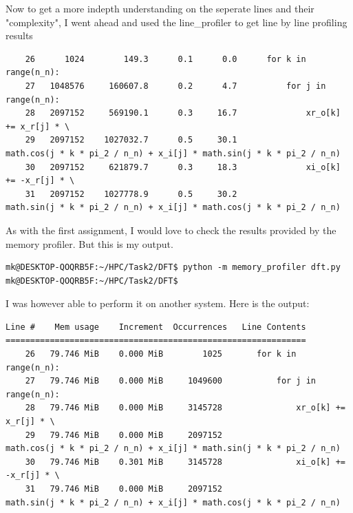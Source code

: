 \documentclass{article}
\begin{document}
Now to get a more indepth understanding on the seperate lines and their "complexity", I went ahead and used the line\_profiler to get line by line profiling results


\begin{minipage}{\linewidth}
\begin{verbatim}
    26      1024        149.3      0.1      0.0      for k in range(n_n):
    27   1048576     160607.8      0.2      4.7          for j in range(n_n):
    28   2097152     569190.1      0.3     16.7              xr_o[k] += x_r[j] * \
    29   2097152    1027032.7      0.5     30.1                  math.cos(j * k * pi_2 / n_n) + x_i[j] * math.sin(j * k * pi_2 / n_n)
    30   2097152     621879.7      0.3     18.3              xi_o[k] += -x_r[j] * \
    31   2097152    1027778.9      0.5     30.2                  math.sin(j * k * pi_2 / n_n) + x_i[j] * math.cos(j * k * pi_2 / n_n)
\end{verbatim}
\end{minipage}


As with the first assignment, I would love to check the results provided by the memory profiler. But this is my output.

\begin{minipage}{\linewidth}
\begin{verbatim}
mk@DESKTOP-QOQRB5F:~/HPC/Task2/DFT$ python -m memory_profiler dft.py
mk@DESKTOP-QOQRB5F:~/HPC/Task2/DFT$ 
\end{verbatim}
\end{minipage}


I was however able to perform it on another system.
Here is the output:

\begin{minipage}{\linewidth}
\begin{verbatim}
Line #    Mem usage    Increment  Occurrences   Line Contents
=============================================================
    26   79.746 MiB    0.000 MiB        1025       for k in range(n_n):
    27   79.746 MiB    0.000 MiB     1049600           for j in range(n_n):
    28   79.746 MiB    0.000 MiB     3145728               xr_o[k] += x_r[j] * \
    29   79.746 MiB    0.000 MiB     2097152                   math.cos(j * k * pi_2 / n_n) + x_i[j] * math.sin(j * k * pi_2 / n_n)
    30   79.746 MiB    0.301 MiB     3145728               xi_o[k] += -x_r[j] * \
    31   79.746 MiB    0.000 MiB     2097152                   math.sin(j * k * pi_2 / n_n) + x_i[j] * math.cos(j * k * pi_2 / n_n)
\end{verbatim}
\end{minipage}
\end{document}
